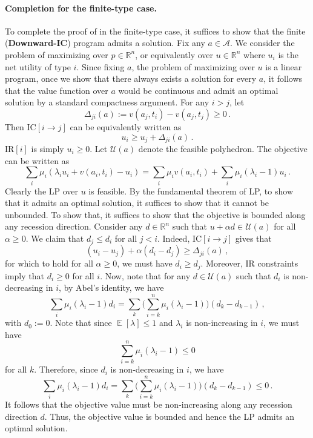 \documentclass[12pt,letterpaper]{article}
\newenvironment{original}{\color{black}\noindent}{}
\theoremstyle{plain}
\theoremstyle{definition}
\theoremstyle{remark}
\DeclareMathOperator{\E}{\mathds{E}}
\newcommand{\R}{\mathds{R}}
\renewcommand{\1}{\mathds{1}}
\theoremstyle{definition}
\begin{document}
\paragraph{Completion for the finite-type case.}\hspace{-2mm}\begin{original}To complete the proof of  in the finite-type case, it suffices to show that the finite (\textbf{Downward-IC}) program admits a solution. Fix any $a \in \mathcal{A}$. We consider the problem of maximizing over $p \in \R^n$, or equivalently over $u \in \R^n$ where $u_i$ is the net utility of type $i$. Since fixing $a$, the problem of maximizing over $u$ is a linear program, once we show that there always exists a solution for every $a$, it follows that the value function over $a$ would be continuous and admit an optimal solution by a standard compactness argument. For any $i > j$, let  \[\Delta_{ji}(a) := v(a_j, t_i) - v(a_j, t_j) \geq 0\,.\]
Then IC$[i \rightarrow j]$ can be equivalently written as
\[u_i \geq u_j + \Delta_{ji}(a)\,.\]
IR$[i]$ is simply $u_i \geq 0$. Let $\mathcal{U}(a)$ denote the feasible polyhedron. The objective can be written as
\[\sum_i \mu_i (\lambda_i u_i + v(a_i, t_i) - u_i)  = \sum_i \mu_i v(a_i, t_i) + \sum_i \mu_i (\lambda_i- 1) u_i \,.\]
Clearly the LP over $u$ is feasible. By the fundamental theorem of LP, to show that it admits an optimal solution, it suffices to show that it cannot be unbounded. To show that, it suffices to show that the objective is bounded along any recession direction. Consider any $d \in \R^n$ such that $u + \alpha d \in \mathcal{U}(a)$ for all $\alpha \geq 0$. We claim that $d_j \leq d_i$ for all $j < i$. Indeed, IC$[i \rightarrow j]$ gives that
\[(u_i - u_j) + \alpha (d_i - d_j) \geq \Delta_{ji}(a)\,,\]
for which to hold for all $\alpha \geq 0$, we must have $d_i \geq d_j$. Moreover, IR constraints imply that $d_i \geq 0$ for all $i$. Now, note that for any $d \in \mathcal{U}(a)$ such that $d_i$ is non-decreasing in $i$, by Abel's identity, we have
\[\sum_i \mu_i (\lambda_i- 1) d_i = \sum_{k} \big(\sum_{i=k}^n \mu_i (\lambda_i- 1)\big) (d_{k} - d_{k-1})  \,,\]
with $d_0 := 0$. Note that since $\E[\lambda] \leq 1$ and $\lambda_i$ is non-increasing in $i$, we must have
\[\sum_{i=k}^n \mu_i (\lambda_i- 1) \leq 0\]
for all $k$. Therefore, since $d_i$ is non-decreasing in $i$, we have
\[\sum_i \mu_i (\lambda_i- 1) d_i = \sum_{k} \big(\sum_{i=k}^n \mu_i (\lambda_i- 1)\big) (d_{k} - d_{k-1}) \leq 0 \,.\]
It follows that the objective value must be non-increasing along any recession direction $d$. Thus, the objective value is bounded and hence the LP admits an optimal solution.
\end{original}
\end{document}
